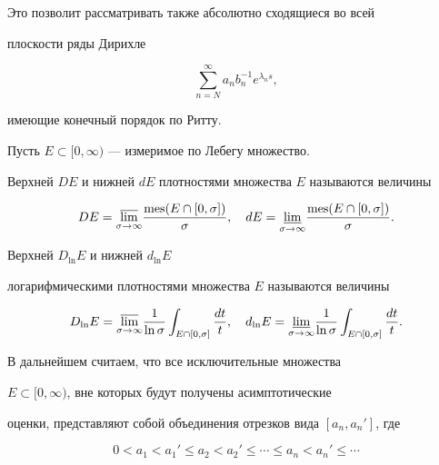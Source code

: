 Это позволит рассматривать также абсолютно сходящиеся во всей


плоскости ряды Дирихле


$$


\sum_{n=N}^{\infty}a_{n}b_{n}^{-1}e^{\lambda_{n}s},


$$


имеющие конечный порядок по Ритту.





Пусть $E\subset[0,\infty)$ --- измеримое по Лебегу множество.





Верхней $DE$ и нижней $dE$ плотностями множества $E$ называются величины


$$


DE=\underset{\sigma\to\infty}{\varlimsup}{}


\frac{\mes(E\cap[0,\sigma])}{\sigma},\quad


dE=\underset{\sigma\to\infty}{\varliminf}{}


\frac{\mes(E\cap[0,\sigma])}{\sigma}.


$$





Верхней $D_{\ln}E$ и нижней $d_{\ln}E$ 


логарифмическими плотностями множества $E$ называются величины


$$


D_{\ln}E=\underset{\sigma\to\infty}{\varlimsup}{}


\frac{1}{\ln\sigma}\int_{E\cap[0,\sigma]}\frac{dt}{t},\quad


d_{\ln}E=\underset{\sigma\to\infty}{\varliminf}{}


\frac{1}{\ln\sigma}\int_{E\cap[0,\sigma]}\frac{dt}{t}.


$$





В дальнейшем считаем, что все исключительные множества


$E\subset[0,\infty)$, вне которых будут получены асимптотические


оценки, представляют собой объединения отрезков вида $[a_{n},a_{n}']$, где


$$


0<a_{1}<a_{1}'\leq a_{2}<a_{2}'\leq\dotsb\leq a_{n}<a_{n}'\leq\dotsb


$$





